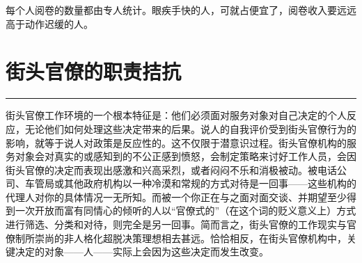 \documentclass[12pt,a4paper]{article}
\begin{document}
每个人阅卷的数量都由专人统计。眼疾手快的人，可就占便宜了，阅卷收入要远远高于动作迟缓的人。

\newpage\section{街头官僚的职责拮抗}
\vspace{0.5em}
\vspace{0.3em}

\noindent\rule{\textwidth}{0.4pt}

\vspace{0.3em}





街头官僚工作环境的一个根本特征是：他们必须面对服务对象对自己决定的个人反应，无论他们如何处理这些决定带来的后果。说人的自我评价受到街头官僚行为的影响，就等于说人对政策是反应性的。这不仅限于潜意识过程。街头官僚机构的服务对象会对真实的或感知到的不公正感到愤怒，会制定策略来讨好工作人员，会因街头官僚的决定而表现出感激和兴高采烈，或者闷闷不乐和消极被动。被电话公司、车管局或其他政府机构以一种冷漠和常规的方式对待是一回事——这些机构的代理人对你的具体情况一无所知。而被一个你正在与之面对面交谈、并期望至少得到一次开放而富有同情心的倾听的人以“官僚式的”（在这个词的贬义意义上）方式进行筛选、分类和对待，则完全是另一回事。简而言之，街头官僚的工作现实与官僚制所崇尚的非人格化超脱决策理想相去甚远。恰恰相反，在街头官僚机构中，关键决定的对象——人——实际上会因为这些决定而发生改变。
\end{document}
